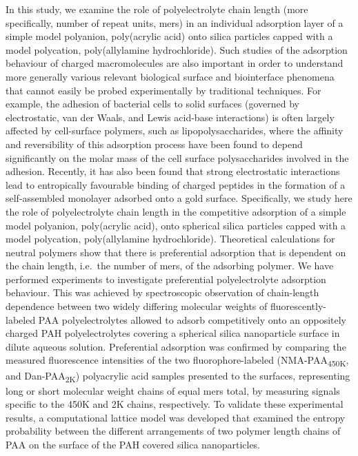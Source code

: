 \documentclass[twoside,twocolumn,9pt]{article}
\begin{document}
In this study, we examine the role of polyelectrolyte chain length (more specifically, number of repeat units, mers) in an individual adsorption layer of a simple model polyanion, poly(acrylic acid) onto silica particles capped with a model polycation, poly(allylamine hydrochloride).  Such studies of the adsorption behaviour of charged macromolecules are also important in order to understand more generally various relevant biological surface and biointerface phenomena that cannot easily be probed experimentally by traditional techniques.  For example, the adhesion of bacterial cells to solid surfaces (governed by electrostatic, van der Waals, and Lewis acid-base interactions) is often largely affected by cell-surface polymers, such as lipopolysaccharides,\cite{Jucker1997} where   the affinity and reversibility of this adsorption process have been found to depend significantly on the molar mass of the cell surface polysaccharides involved in the adhesion.\cite{Jucker1997}  
Recently, it has also been found that strong electrostatic interactions lead to entropically favourable binding of charged peptides in the formation of a self-assembled monolayer adsorbed onto a gold surface.\cite{Sprenger2016} 
Specifically, we study here the role of polyelectrolyte chain length in the competitive adsorption of a simple model polyanion, poly(acrylic acid), onto spherical silica particles capped with a model polycation, poly(allylamine hydrochloride). Theoretical calculations for neutral polymers show that there is preferential adsorption that is dependent on the chain length, i.e.\ the number of mers, of the adsorbing polymer. 
We have performed experiments to investigate preferential polyelectrolyte adsorption behaviour. 
This was achieved by spectroscopic 
observation of chain-length dependence between two widely differing molecular weights of fluorescently-labeled PAA polyelectrolytes allowed to adsorb competitively onto an oppositely charged PAH polyelectrolytes covering a spherical silica nanoparticle surface in dilute aqueous solution. 
Preferential adsorption was confirmed by comparing the measured fluorescence intensities of the two fluorophore-labeled (NMA-PAA\textsubscript{450K}, and Dan-PAA\textsubscript{2K}) polyacrylic acid samples presented to the surfaces, representing long or short molecular weight chains of equal mers total, by measuring signals specific to the 450K and 2K chains, respectively. To validate these experimental results, a computational lattice model was developed that examined the entropy probability between the different arrangements of two polymer length chains of PAA on the surface of the PAH covered silica nanoparticles. 
\end{document}
